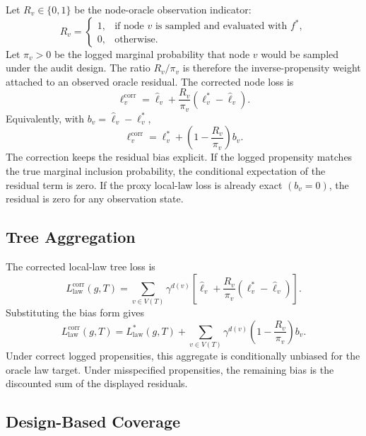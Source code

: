 Let \(R_v\in\{0,1\}\) be the node-oracle observation indicator:
\[
  R_v=
  \begin{cases}
    1, & \text{if node }v\text{ is sampled and evaluated with }f^\ast,\\
    0, & \text{otherwise.}
  \end{cases}
\]
Let \(\pi_v>0\) be the logged marginal probability that node \(v\) would be
sampled under the audit design. The ratio \(R_v/\pi_v\) is therefore the
inverse-propensity weight attached to an observed oracle residual. The
corrected node loss is
\begin{equation}
\label{eq:v8-app-node-correction}
  \ell_v^{\mathrm{corr}}
  =
  \widehat\ell_v
  +
  \frac{R_v}{\pi_v}
  \left(\ell_v^\ast-\widehat\ell_v\right).
\end{equation}
Equivalently, with \(b_v=\widehat\ell_v-\ell_v^\ast\),
\begin{equation}
\label{eq:v8-app-node-bias-form}
  \ell_v^{\mathrm{corr}}
  =
  \ell_v^\ast
  +
  \left(1-\frac{R_v}{\pi_v}\right)b_v .
\end{equation}
The correction keeps the residual bias explicit. If the logged propensity
matches the true marginal inclusion probability, the conditional expectation of
the residual term is zero. If the proxy local-law loss is already exact
\((b_v=0)\), the residual is zero for any observation state.

\subsection{Tree Aggregation}
\label{app:v8-tree-correction}

The corrected local-law tree loss is
\begin{equation}
\label{eq:v8-app-corrected-tree-loss}
  L_{\mathrm{law}}^{\mathrm{corr}}(g,T)
  =
  \sum_{v\in V(T)}
  \gamma^{d(v)}
  \left[
    \widehat\ell_v
    +
    \frac{R_v}{\pi_v}
    \left(\ell_v^\ast-\widehat\ell_v\right)
  \right].
\end{equation}
Substituting the bias form gives
\[
  L_{\mathrm{law}}^{\mathrm{corr}}(g,T)
  =
  L_{\mathrm{law}}^\ast(g,T)
  +
  \sum_{v\in V(T)}
  \gamma^{d(v)}
  \left(1-\frac{R_v}{\pi_v}\right)b_v .
\]
Under correct logged propensities, this aggregate is conditionally unbiased for
the oracle law target. Under misspecified propensities, the remaining bias is
the discounted sum of the displayed residuals.

\subsection{Design-Based Coverage}
\label{app:v8-design-coverage}

